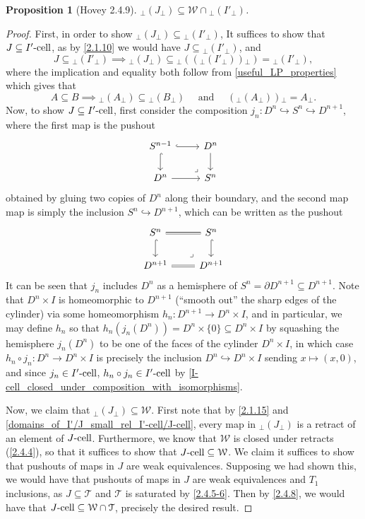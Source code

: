 \documentclass{amsart}
\theoremstyle{plain}
\newtheorem{proposition}[theorem]{Proposition}
\theoremstyle{definition}
\newcommand{\sseq}{\subseteq}
\newcommand{\0}{\mathbf{0}}
\newcommand{\p}{{_\perp}}
\newcommand{\into}{\hookrightarrow}
\newcommand{\cT}{\mathcal T}
\newcommand{\cW}{\mathcal W}
\renewcommand{\(}{\left(}
\renewcommand{\)}{\right)}
\newcommand{\cell}{\text-\mathrm{cell}}
\begin{document}
\begin{proposition}[Hovey 2.4.9]\label{2.4.9}
  ${\p({J}\p)}\sseq\cW\cap {\p( I'\p )}$.
\end{proposition}
\begin{proof}
  First, in order to show ${\p(J\p)}\sseq{\p( I'\p )}$, It suffices to show that $J\sseq I'\cell$, as by \autoref{2.1.10} we would have $J\sseq{\p( I'\p )}$, and
  \[J\sseq {\p( I'\p )}\implies{\p(J\p)}\sseq{\p((\p( I'\p ))\p)}={\p( I'\p )},\]
  where the implication and equality both follow from \autoref{useful_LP_properties} which gives that
  \[A\sseq B\implies {\p(A\p)}\sseq{\p(B\p)}\quad\text{ and }\quad(\p({A}\p))\p=A\p.\]
  Now, to show $J\sseq I'\cell$, first consider the composition $j_n:D^n\into S^n\into D^{n+1}$, where the first map is the pushout
  \[\begin{tikzcd}
    {S^{n-1}} & {D^n} \\
    {D^n} & {S^n}
    \arrow[hook, from=1-1, to=1-2]
    \arrow[hook, from=1-1, to=2-1]
    \arrow[from=2-1, to=2-2]
    \arrow[from=1-2, to=2-2]
    \arrow["\ulcorner"{anchor=center, pos=0.125, rotate=180}, draw=none, from=2-2, to=1-1]
  \end{tikzcd}\]
  obtained by gluing two copies of $D^n$ along their boundary, and the second map map is simply the inclusion $S^n\into D^{n+1}$, which can be written as the pushout
  \[\begin{tikzcd}
    {S^n} & {S^n} \\
    {D^{n+1}} & {D^{n+1}}
    \arrow[Rightarrow, no head, from=1-1, to=1-2]
    \arrow[hook, from=1-1, to=2-1]
    \arrow[Rightarrow, no head, from=2-1, to=2-2]
    \arrow[hook, from=1-2, to=2-2]
    \arrow["\ulcorner"{anchor=center, pos=0.125, rotate=180}, draw=none, from=2-2, to=1-1]
  \end{tikzcd}\]
  It can be seen that $j_n$ includes $D^n$ as a hemisphere of $S^n=\partial D^{n+1}\sseq D^{n+1}$. Note that $D^{n}\times I$ is homeomorphic to $D^{n+1}$ (``smooth out'' the sharp edges of the cylinder) via some homeomorphism $h_n:D^{n+1}\to D^n\times I$, and in particular, we may define $h_n$ so that $h_n(j_n(D^n))= D^n\times\{0\}\sseq D^n\times I$ by squashing the hemisphere $j_n(D^n)$ to be one of the faces of the cylinder $D^n\times I$, in which case $h_n\circ j_n:D^n\to D^n\times I$ is precisely the inclusion $D^n\into D^n\times I$ sending $x\mapsto (x,0)$, and since $j_n\in I'\cell$, $h_n\circ j_n\in I'\cell$ by \autoref{I-cell_closed_under_composition_with_isomorphisms}.

  Now, we claim that $\p(J\p)\sseq\cW$. First note that by \autoref{2.1.15} and \autoref{domains_of_I'/J_small_rel_I'-cell/J-cell}, every map in $\p(J\p)$ is a retract of an element of $J\cell$. Furthermore, we know that $\cW$ is closed under retracts (\autoref{2.4.4}), so that it suffices to show that $J\cell\sseq\cW$. We claim it suffices to show that pushouts of maps in $J$ are weak equivalences. Supposing we had shown this, we would have that pushouts of maps in $J$ are weak equivalences and $T_1$ inclusions, as $J\sseq\cT$ and $\cT$ is saturated by \autoref{2.4.5-6}. Then by \autoref{2.4.8}, we would have that $J\cell\sseq\cW\cap\cT$, precisely the desired result.
  

\end{proof}
\end{document}
